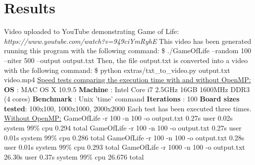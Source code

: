 \documentclass[a4paper,12pt,twoside]{report}
\begin{document}
\section*{Results}
Video uploaded to YouTube demonstrating Game of Life:
\newline\newline
\textit{https://www.youtube.com/watch?v=949ciYmRyhE}
\newline\newline
This video has been generated running this program with the following command:
\newline\newline
\$ ./GameOfLife --random 100 --niter 500 --output output.txt
\newline\newline
Then, the file output.txt is converted into a video with the following command:
\newline\newline
\$ python extras/txt\_to\_video.py output.txt video.mp4
\newline\newline
\underline{Speed tests comparing the execution time with and without OpenMP:}
\newline\newline
\textbf{OS}                : MAC OS X 10.9.5 \newline
\textbf{Machine}           : Intel Core i7 2.5GHz 16GB 1600MHz DDR3 (4 cores) \newline
\textbf{Benchmark}         : Unix 'time' command \newline
\textbf{Iterations}        : 100 \newline
\textbf{Board sizes tested}: 100x100, 1000x1000, 2000x2000 \newline
\newline
Each test has been executed three times.
\newline\newline
\underline{Without OpenMP:}
\newline\newline
GameOfLife -r 100 -n 100 -o output.txt  0.27s user 0.02s system 99\% cpu 0.294 total \newline
GameOfLife -r 100 -n 100 -o output.txt  0.27s user 0.01s system 99\% cpu 0.286 total \newline
GameOfLife -r 100 -n 100 -o output.txt  0.28s user 0.01s system 99\% cpu 0.293 total \newline
\newline
GameOfLife -r 1000 -n 100 -o output.txt  26.30s user 0.37s system 99\% cpu 26.676 total \newline
\end{document}
